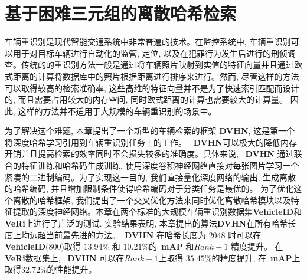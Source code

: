 \chapter{基于困难三元组的离散哈希检索}
车辆重识别是现代智能交通系统中非常普遍的技术。在监控系统中, 车辆重识别可以用于对目标车辆进行自动化的监管, 定位, 以及在犯罪行为发生后进行的刑侦调查。传统的的重识别方法一般是通过将车辆照片映射到实值的特征向量并且通过欧式距离的计算将数据库中的照片根据距离进行排序来进行。然而, 尽管这样的方法可以取得较高的检索准确率, 这些高维的特征向量并不是为了快速索引匹配而设计的, 而且需要占用较大的内存空间, 同时欧式距离的计算也需要较大的计算量。 因此, 这样的方法并不适用于大规模的车辆重识别的场景中。 \par
为了解决这个难题, 本章提出了一个新型的车辆检索的框架 \textbf{DVHN}, 这是第一个将深度哈希学习引用到车辆重识别任务上的工作。 ~\textbf{DVHN}可以极大的降低内存开销并且提高检索的效率同时不会损失较多的准确度。具体来说, ~\textbf{DVHN} 通过联合的特征训练和哈希码生成训练, 使用深度卷积神经网络直接对每张图片学习一个紧凑的二进制编码。为了实现这一目的, 我们直接量化深度网络的输出, 生成离散的哈希编码, 并且增加限制条件使得哈希编码对于分类任务是最优的。 为了优化这个离散的哈希框架, 我们提出了一个交叉优化方法来同时优化离散哈希模块以及特征提取的深度神经网络。本章在两个标准的大规模车辆重识别数据集\textbf{VehicleID}和\textbf{VeRi}上进行了广泛的测试. 实验结果表明, 本章提出的算法\textbf{DVHN}在所有哈希长度上均远超当前最先进的方法。~\textbf{DVHN} 在哈希长度为 $2048$ 时可以在\textbf{VehicleID}(800)取得 $13.94 \%$ 和 $10.21 \%$的~\textbf{mAP} 和$Rank-1$ 精度提升。 在 \textbf{VeRi}数据集上, ~\textbf{DVHN} 可以在$Rank-1$上取得 $35.45 \%$的精度提升, 在~\textbf{mAP}上取得$32.72 \%$的性能提升。
